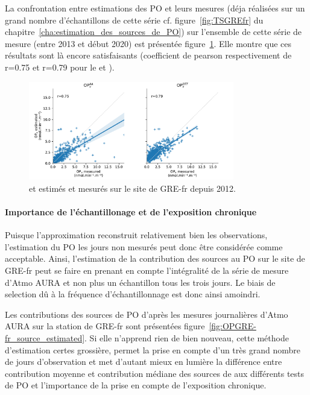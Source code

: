 La confrontation entre estimations des PO et leurs mesures (déja réalisées sur un grand
nombre d'échantillons de cette série cf. figure~\ref{fig:TSGREfr} du
chapitre~\ref{cha:estimation_des_sources_de_PO}) sur l'ensemble de cette série de mesure
(entre 2013 et début 2020) est présentée figure~\ref{fig:OPGRE-fr-estimated_scatter}. Elle
montre que ces résultats sont là encore satisfaisants (coefficient de pearson respectivement de r=0.75 et r=0.79
pour le \POAAv{} et \PODTTv).

\begin{figure}[ht]
    \centering
    \includegraphics[width=0.8\textwidth]{figures/chapter05/OPGRE-fr_estimated_scatter.pdf}
    \caption{\POAAv{} et \PODTTv{} estimés et mesurés sur le site de GRE-fr depuis 2012.}
    \label{fig:OPGRE-fr-estimated_scatter}
\end{figure}

\paragraph{Importance de l'échantillonage et de l'exposition chronique}%
\label{par:importance_de_l_échantillonage_et_de_l_exposition_chronique}

Puisque l'approximation reconstruit relativement bien les observations, l'estimation du PO
les jours non mesurés peut donc être considérée comme acceptable. Ainsi, l'estimation de
la contribution des sources au PO sur le site de GRE-fr peut se faire en prenant en compte
l'intégralité de la série de mesure d'Atmo AURA et non plus un échantillon tous les trois
jours. Le biais de selection dû à la fréquence d'échantillonnage est donc ainsi amoindri.

Les contributions des sources de PO d'après les mesures journalières d'Atmo AURA sur la
station de GRE-fr sont présentées figure~\ref{fig:OPGRE-fr_source_estimated}.%
Si elle n'apprend rien de bien nouveau, cette méthode d'estimation certes grossière,
permet la prise en compte d'un très grand nombre de jours d'observation et met d'autant
mieux en lumière la différence entre contribution moyenne et contribution médiane des
sources de \PMdix{} aux différents tests de PO et l'importance de la prise en compte de
l'exposition chronique.

